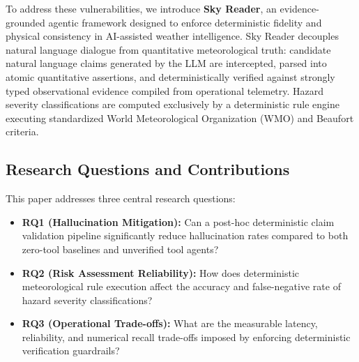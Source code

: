 \documentclass[conference]{IEEEtran}
\begin{document}
To address these vulnerabilities, we introduce \textbf{Sky Reader}, an evidence-grounded agentic framework designed to enforce deterministic fidelity and physical consistency in AI-assisted weather intelligence. Sky Reader decouples natural language dialogue from quantitative meteorological truth: candidate natural language claims generated by the LLM are intercepted, parsed into atomic quantitative assertions, and deterministically verified against strongly typed observational evidence compiled from operational telemetry. Hazard severity classifications are computed exclusively by a deterministic rule engine executing standardized World Meteorological Organization (WMO) and Beaufort criteria.

\subsection{Research Questions and Contributions}
This paper addresses three central research questions:
\begin{itemize}
    \item \textbf{RQ1 (Hallucination Mitigation):} Can a post-hoc deterministic claim validation pipeline significantly reduce hallucination rates compared to both zero-tool baselines and unverified tool agents?
    \item \textbf{RQ2 (Risk Assessment Reliability):} How does deterministic meteorological rule execution affect the accuracy and false-negative rate of hazard severity classifications?
    \item \textbf{RQ3 (Operational Trade-offs):} What are the measurable latency, reliability, and numerical recall trade-offs imposed by enforcing deterministic verification guardrails?
\end{itemize}
\end{document}
